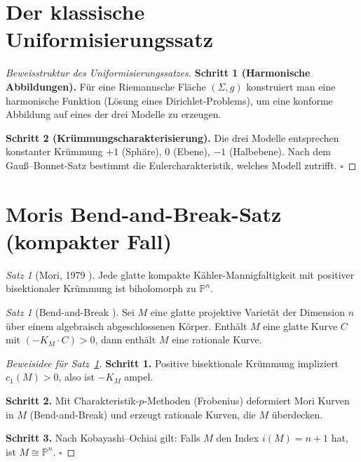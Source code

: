 \documentclass[12pt,a4paper]{amsart}
\theoremstyle{definition}
\theoremstyle{remark}
\newtheorem{satz}[theorem]{Satz}
\newcommand{\PP}{\mathbb{P}}
\begin{document}
\section{Der klassische Uniformisierungssatz}

\begin{proof}[Beweisstruktur des Uniformisierungssatzes]
\textbf{Schritt 1 (Harmonische Abbildungen).}  Für eine Riemannsche Fläche
$(\Sigma, g)$ konstruiert man eine harmonische Funktion (Lösung eines
Dirichlet-Problems), um eine konforme Abbildung auf eines der drei Modelle
zu erzeugen.

\textbf{Schritt 2 (Krümmungscharakterisierung).}  Die drei Modelle
entsprechen konstanter Krümmung $+1$ (Sphäre), $0$ (Ebene), $-1$ (Halbebene).
Nach dem Gauß--Bonnet-Satz bestimmt die Eulercharakteristik, welches Modell
zutrifft. $\square$
\end{proof}

\section{Moris Bend-and-Break-Satz (kompakter Fall)}

\begin{satz}[Mori, 1979 \cite{Mori1979}]
\label{satz:mori}
Jede glatte kompakte Kähler-Mannigfaltigkeit mit positiver bisektionaler
Krümmung ist biholomorph zu $\PP^n$.
\end{satz}

\begin{satz}[Bend-and-Break \cite{Mori1979}]
Sei $M$ eine glatte projektive Varietät der Dimension $n$ über einem
algebraisch abgeschlossenen Körper.  Enthält $M$ eine glatte Kurve $C$ mit
$(-K_M \cdot C) > 0$, dann enthält $M$ eine rationale Kurve.
\end{satz}

\begin{proof}[Beweisidee für Satz~\ref{satz:mori}]
\textbf{Schritt 1.}  Positive bisektionale Krümmung impliziert $c_1(M) > 0$,
also ist $-K_M$ ampel.

\textbf{Schritt 2.}  Mit Charakteristik-$p$-Methoden (Frobenius) deformiert
Mori Kurven in $M$ (Bend-and-Break) und erzeugt rationale Kurven,
die $M$ überdecken.

\textbf{Schritt 3.}  Nach Kobayashi--Ochiai gilt: Falls $M$ den Index
$i(M) = n+1$ hat, ist $M \cong \PP^n$. $\square$
\end{proof}
\end{document}
